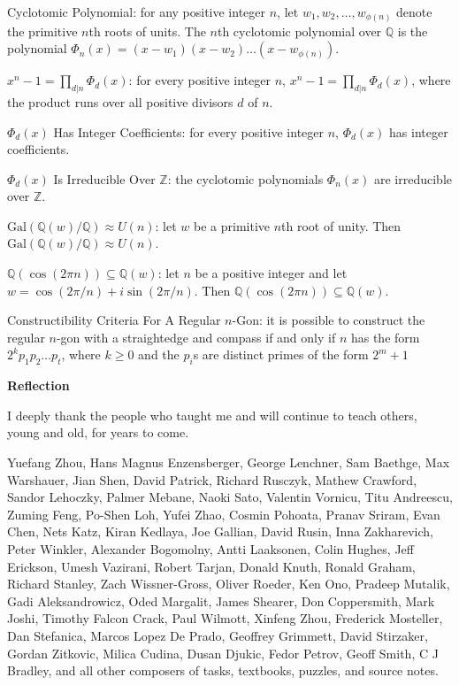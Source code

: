 Cyclotomic Polynomial: for any positive integer $n$, let $w_1,w_2,\dots,w_{\phi (n)}$ denote the primitive $n$th roots of units. The $n$th cyclotomic polynomial over $\mathbb{Q}$ is the polynomial $\Phi_n (x)=(x-w_1)(x-w_2)\dots (x-w_{\phi (n)})$.

$x^n-1=\prod_{d|n} \Phi_d (x)$: for every positive integer $n$, $x^n-1=\prod_{d|n} \Phi_d (x)$, where the product runs over all positive divisors $d$ of $n$.

$\Phi_d (x)$ Has Integer Coefficients: for every positive integer $n$, $\Phi_d (x)$ has integer coefficients.

$\Phi_d (x)$ Is Irreducible Over $\mathbb{Z}$: the cyclotomic polynomials $\Phi_n (x)$ are irreducible over $\mathbb{Z}$.

$\text{Gal}(\mathbb{Q}(w)/\mathbb{Q}) \approx U(n)$: let $w$ be a primitive $n$th root of unity. Then $\text{Gal}(\mathbb{Q}(w)/\mathbb{Q}) \approx U(n)$.

$\mathbb{Q}(\cos(2 \pi n)) \subseteq \mathbb{Q}(w)$: let $n$ be a positive integer and let $w=\cos(2\pi /n) + i\sin(2\pi /n)$. Then $\mathbb{Q}(\cos(2 \pi n)) \subseteq \mathbb{Q}(w)$.

Constructibility Criteria For A Regular $n$-Gon: it is possible to construct the regular $n$-gon with a straightedge and compass if and only if $n$ has the form $2^k p_1p_2\dots p_t$, where $k \ge 0$ and the $p_i$s are distinct primes of the form $2^m+1$

\newpage

\onecolumn

\textbf{Reflection}

I deeply thank the people who taught me and will continue to teach others, young and old, for years to come.

Yuefang Zhou, Hans Magnus Enzensberger, George Lenchner, Sam Baethge, Max Warshauer, Jian Shen, David Patrick, Richard Rusczyk, Mathew Crawford, Sandor Lehoczky, Palmer Mebane, Naoki Sato, Valentin Vornicu, Titu Andreescu, Zuming Feng, Po-Shen Loh, Yufei Zhao, Cosmin Pohoata, Pranav Sriram, Evan Chen, Nets Katz, Kiran Kedlaya, Joe Gallian, David Rusin, Inna Zakharevich, Peter Winkler, Alexander Bogomolny, Antti Laaksonen, Colin Hughes, Jeff Erickson, Umesh Vazirani, Robert Tarjan, Donald Knuth, Ronald Graham, Richard Stanley, Zach Wissner-Gross, Oliver Roeder, Ken Ono, Pradeep Mutalik, Gadi Aleksandrowicz, Oded Margalit, James Shearer, Don Coppersmith, Mark Joshi, Timothy Falcon Crack, Paul Wilmott, Xinfeng Zhou, Frederick Mosteller, Dan Stefanica, Marcos Lopez De Prado, Geoffrey Grimmett, David Stirzaker, Gordan Zitkovic, Milica Cudina, Dusan Djukic, Fedor Petrov, Geoff Smith, C J Bradley, and all other composers of tasks, textbooks, puzzles, and source notes.

